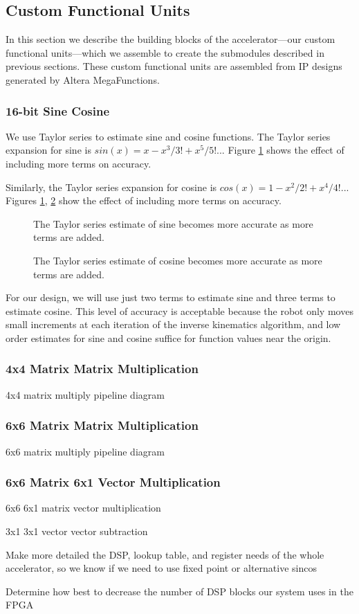 \subsection{Custom Functional Units}
In this section we describe the building blocks of the accelerator—our custom functional units—which we assemble to create the submodules described in previous sections. These custom functional units are assembled from IP designs generated by Altera MegaFunctions.

\subsubsection{16-bit Sine Cosine}
We use Taylor series to estimate sine and cosine functions. The Taylor series expansion for sine is $sin(x) = x - x^3/3! + x^5/5!$... Figure \ref{fig:sine} shows the effect of including more terms on accuracy. 

Similarly, the Taylor series expansion for cosine is $cos(x) = 1 - x^2/2! + x^4/4!$... Figures  \ref{fig:sine}, \ref{fig:cosine} show the effect of including more terms on accuracy.

\begin{figure}[ht]
\center
{}
\caption{The Taylor series estimate of sine becomes more accurate as more terms are added.}
\label{fig:sine}
\end{figure}

\begin{figure}[ht]
\center
{}
\caption{The Taylor series estimate of cosine becomes more accurate as more terms are added.}
\label{fig:cosine}
\end{figure}

For our design, we will use just two terms to estimate sine and three terms to estimate cosine. This level of accuracy is acceptable because the robot only moves small increments at each iteration of the inverse kinematics algorithm, and low order estimates for sine and cosine suffice for function values near the origin.



\subsubsection{4x4 Matrix Matrix Multiplication}
4x4 matrix multiply pipeline diagram
\subsubsection{6x6 Matrix Matrix Multiplication}
6x6 matrix multiply pipeline diagram
\subsubsection{6x6 Matrix 6x1 Vector Multiplication}
6x6 6x1 matrix vector multiplication

3x1 3x1 vector vector subtraction

Make more detailed the DSP, lookup table, and register needs of the whole accelerator, so we know if we need to use fixed point or alternative sincos

Determine how best to decrease the number of DSP blocks our system uses in the FPGA
